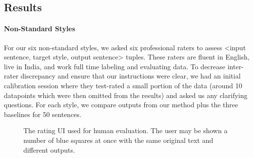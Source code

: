 \subsection{Results}
\paragraph{Non-Standard Styles}
For our six non-standard styles, we asked six professional raters to assess  <input sentence, target style, output sentence> tuples. These raters are fluent in English, live in India, and work full time labeling and evaluating data. To decrease inter-rater discrepancy and ensure that our instructions were clear, we had an initial calibration session where they test-rated a small portion of the data (around 10 datapoints which were then omitted from the results) and asked us any clarifying questions. For each style, we compare outputs from our method plus the three baselines for 50 sentences.

\begin{figure}[tbp]
  \centering
  \caption{The rating UI used for human evaluation. The user may be shown a number of blue squares at once with the same original text and different outputs.}
  \label{fig:rater_ui}
\end{figure} 

